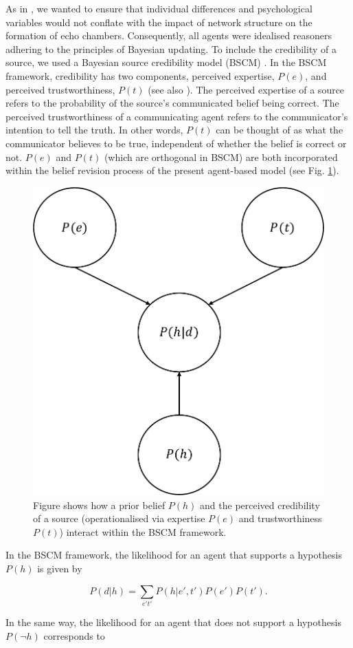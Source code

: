 \documentclass[fleqn,10pt]{wlscirep}
\begin{document}
As in \cite{madsen2017growing, madsen2018large}, we wanted to ensure that individual differences and psychological variables would not conflate with the impact of network structure on the formation of echo chambers. Consequently, all agents were idealised reasoners adhering to the principles of Bayesian updating. To include the credibility of a source, we used a Bayesian source credibility model (BSCM) \cite{bovens2003bayesian, hahn2009argument, harris2009bayesian}. In the BSCM framework, credibility has two components, perceived expertise, \(P(e)\), and perceived trustworthiness, \(P(t)\) (see also \cite{harris2016appeal}). The perceived expertise of a source refers to the probability of the source's communicated belief being correct. The perceived trustworthiness of a communicating agent refers to the communicator's intention to tell the truth. In other words, \(P(t)\) can be thought of as what the communicator believes to be true, independent of whether the belief is correct or not. \(P(e)\) and \(P(t)\) (which are orthogonal in BSCM) are both incorporated within the belief revision process of the present agent-based model (see Fig. \ref{fig:bscm}).

\begin{figure}[ht]
\centering
\includegraphics[width=0.4\columnwidth]{img/bscm_pdf.pdf}
\caption{Figure shows how a prior belief \(P(h)\) and the perceived credibility of a source (operationalised via expertise \(P(e)\) and trustworthiness \(P(t)\)) interact within the BSCM framework.}
\label{fig:bscm}
\label{fig:bscm}
\end{figure}

In the BSCM framework, the likelihood for an agent that supports a hypothesis  \(P(h)\) is given by

\begin{equation}
    P(d|h) = \sum_{e't'}P(h|e',t')P(e')P(t'). 
\end{equation}

In the same way, the likelihood for an agent that does not support a hypothesis \(P(\neg h)\) corresponds to
\end{document}
